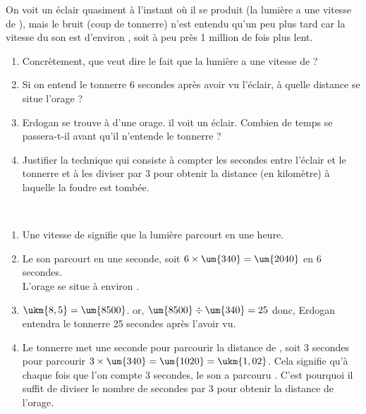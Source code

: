 \begin{colonne*exercice}
\bigskip


\begin{exercice} %
   On voit un éclair quasiment à l’instant où il se produit (la lumière a une vitesse de ), mais le bruit (coup de tonnerre) n’est entendu qu’un peu plus tard car la vitesse du son est d’environ , soit à peu près 1 million de fois plus lent.
   \begin{enumerate}
      \item Concrètement, que veut dire le fait que la lumière a une vitesse de  ?
      \item Si on entend le tonnerre 6 secondes après avoir vu l'éclair, à quelle distance se situe l'orage ?
      \item Erdogan se trouve à  d'une orage. il voit un éclair. Combien de temps se passera-t-il avant qu'il n'entende le tonnerre ?
      \item Justifier la technique qui consiste à compter les secondes entre l'éclair et le tonnerre et à les diviser par 3 pour obtenir la distance (en kilomètre) à laquelle la foudre est tombée.
   \end{enumerate}
\end{exercice}

\begin{corrige}
   \ \\ [-5mm]
   \begin{enumerate}
      \item Une vitesse de  signifie que {\blue la lumière parcourt  en une heure}.
      \item Le son parcourt  en une seconde, soit $6\times\um{340} =\um{2040}$ en 6 secondes. \\
         {\blue L'orage se situe à environ }.
      \item $\ukm{8,5} =\um{8500}$. or, $\um{8500}\div\um{340} =25$ donc,  {\blue Erdogan entendra le tonnerre 25 secondes après l'avoir vu}.
      \item Le tonnerre met une seconde pour parcourir la distance de , soit 3 secondes pour parcourir $3\times\um{340} =\um{1020} =\ukm{1,02}$. Cela signifie qu'à chaque fois que l'on compte 3 secondes, le son a parcouru . C'est pourquoi {\blue il suffit de diviser le nombre de secondes par 3 pour obtenir la distance de l'orage}.
   \end{enumerate}
   
\Coupe



\end{corrige}
\end{colonne*exercice}
